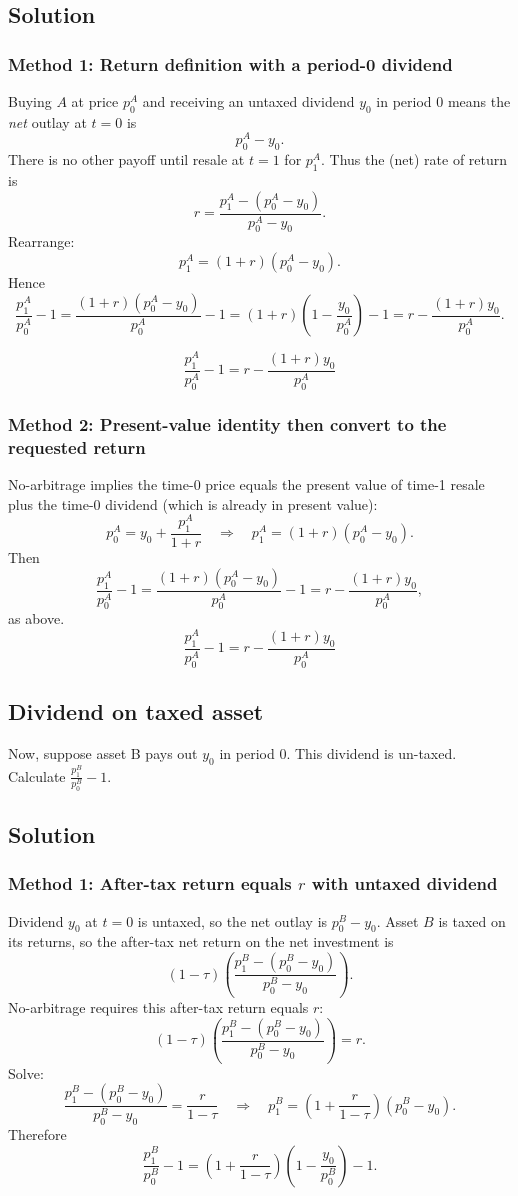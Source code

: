 \documentclass[12pt]{article}
\begin{document}
\subsection*{Solution}
\subsubsection*{Method 1: Return definition with a period-0 dividend}
Buying \(A\) at price \(p^A_0\) and receiving an untaxed dividend \(y_0\) in period 0 means the \emph{net} outlay at \(t=0\) is
\[
p^A_0-y_0.
\]
There is no other payoff until resale at \(t=1\) for \(p^A_1\). Thus the (net) rate of return is
\[
r=\frac{p^A_1-(p^A_0-y_0)}{p^A_0-y_0}.
\]
Rearrange:
\[
p^A_1=(1+r)(p^A_0-y_0).
\]
Hence
\[
\frac{p^A_1}{p^A_0}-1
=\frac{(1+r)(p^A_0-y_0)}{p^A_0}-1
=(1+r)\left(1-\frac{y_0}{p^A_0}\right)-1
=r-\frac{(1+r)y_0}{p^A_0}.
\]

\[
\boxed{\;\frac{p^A_1}{p^A_0}-1=r-\frac{(1+r)y_0}{p^A_0}\;}
\]

\subsubsection*{Method 2: Present-value identity then convert to the requested return}
No-arbitrage implies the time-0 price equals the present value of time-1 resale plus the time-0 dividend (which is already in present value):
\[
p^A_0=y_0+\frac{p^A_1}{1+r}
\quad\Rightarrow\quad
p^A_1=(1+r)(p^A_0-y_0).
\]
Then
\[
\frac{p^A_1}{p^A_0}-1=\frac{(1+r)(p^A_0-y_0)}{p^A_0}-1
=r-\frac{(1+r)y_0}{p^A_0},
\]
as above.
\[
\boxed{\;\frac{p^A_1}{p^A_0}-1=r-\frac{(1+r)y_0}{p^A_0}\;}
\]

\subsection{Dividend on taxed asset}
Now, suppose asset B pays out \(y_0\) in period 0. This dividend is un-taxed. Calculate
\(\frac{p^B_1}{p^B_0}-1\).

\subsection*{Solution}
\subsubsection*{Method 1: After-tax return equals \(r\) with untaxed dividend}
Dividend \(y_0\) at \(t=0\) is untaxed, so the net outlay is \(p^B_0-y_0\).
Asset \(B\) is taxed on its returns, so the after-tax net return on the net investment is
\[
(1-\tau)\left(\frac{p^B_1-(p^B_0-y_0)}{p^B_0-y_0}\right).
\]
No-arbitrage requires this after-tax return equals \(r\):
\[
(1-\tau)\left(\frac{p^B_1-(p^B_0-y_0)}{p^B_0-y_0}\right)=r.
\]
Solve:
\[
\frac{p^B_1-(p^B_0-y_0)}{p^B_0-y_0}=\frac{r}{1-\tau}
\quad\Rightarrow\quad
p^B_1=\left(1+\frac{r}{1-\tau}\right)(p^B_0-y_0).
\]
Therefore
\[
\frac{p^B_1}{p^B_0}-1
=\left(1+\frac{r}{1-\tau}\right)\left(1-\frac{y_0}{p^B_0}\right)-1.
\]
\end{document}
